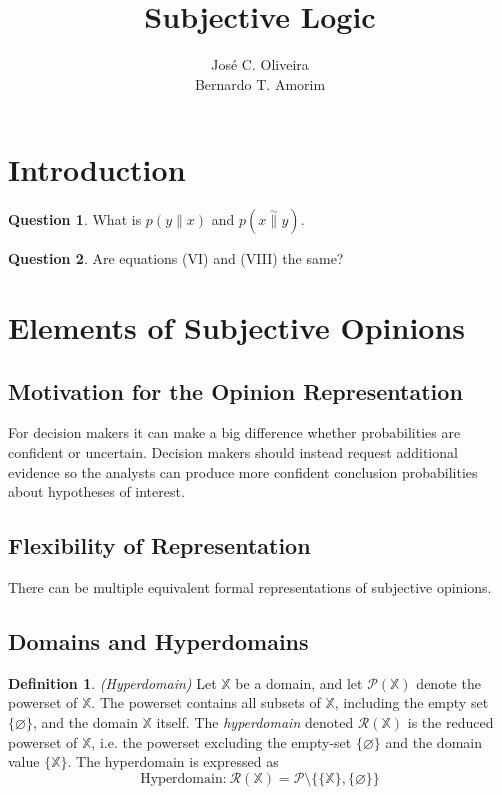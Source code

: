 \documentclass[a4paper,12pt]{article}
\title{Subjective Logic}
\author{José C. Oliveira \\ Bernardo T. Amorim}
\theoremstyle{definition}
\newtheorem{question}{Question}[section]
\newtheorem{definition}{Definition}[section]
\numberwithin{equation}{section}
\begin{document}
\maketitle

\tableofcontents

\section{Introduction}

\begin{question}
	What is $p(y \parallel x)$ and $p(x \overset{\sim}{\parallel} y)$.
\end{question}

\begin{question}
	Are equations (VI) and (VIII) the same?
\end{question}


\section{Elements of Subjective Opinions}

\subsection{Motivation for the Opinion Representation}

For decision makers it can make a big difference whether probabilities are confident or uncertain. Decision makers should instead request additional evidence so the analysts can produce more confident conclusion probabilities
about hypotheses of interest.

\subsection{Flexibility of Representation}

There can be multiple equivalent formal representations of subjective opinions.

\subsection{Domains and Hyperdomains}

\begin{definition}
	 \emph{(Hyperdomain)} Let $\mathbb{X}$ be a domain, and let $\mathcal{P}(\mathbb{X})$ denote the powerset of $\mathbb{X}$. The powerset contains all subsets of $\mathbb{X}$, including the empty set $\{\varnothing\}$, and the domain $\mathbb{X}$ itself. The \emph{hyperdomain} denoted $\mathcal{R}(\mathbb{X})$ is the reduced powerset of $\mathbb{X}$, i.e. the powerset excluding the empty-set $\{\varnothing\}$ and the domain value $\{\mathbb{X}\}$. The hyperdomain is expressed as
	\begin{equation}
		\text{Hyperdomain:}\ \mathcal{R}(\mathbb{X}) = \mathcal{P} \setminus \{\{\mathbb{X}\}, \{\varnothing\}\}
	\end{equation}
\end{definition}
\end{document}

